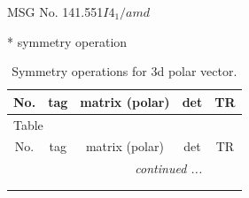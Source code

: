 \documentclass[fleqn,8pt]{jsarticle}
\begin{document}
\setcounter{MaxMatrixCols}{32}

\renewcommand{\tablename}{Table~}
\renewcommand{\figurename}{Figure~}
\begin{center}
\LARGE
MSG No. 141.551\quad$I4_{1}/amd$
\end{center}
* symmetry operation
\renewcommand{\arraystretch}{1.3}
\begin{longtable}{ccccc}
\caption{Symmetry operations for 3d polar vector.}
 \\
 \hline \hline
No. & tag & matrix (polar) & det & TR \\ \hline \endfirsthead

\multicolumn{4}{l}{\tablename\ \thetable{}} \\
 \hline \hline
No. & tag & matrix (polar) & det & TR \\ \hline \endhead

 \hline \hline
\multicolumn{4}{r}{\footnotesize\it continued ...} \\ \endfoot

 \hline \hline
\multicolumn{4}{r}{} \\ \endlastfoot


\end{longtable}
\end{document}

